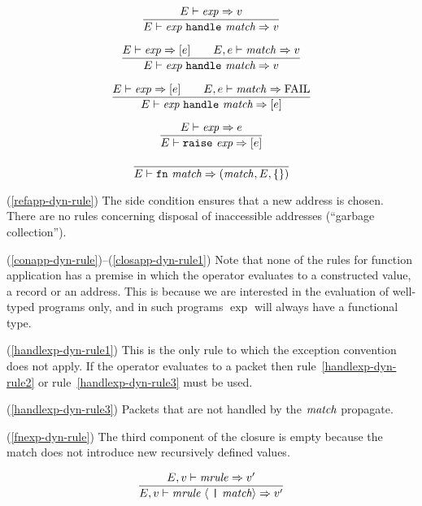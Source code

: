 \begin{equation}        %
\label{handlexp-dyn-rule1}
\frac{\E\ts\exp\ra\V}
     {\E\ts\handlexp\ra\V}
\end{equation}

\begin{equation}        %
\label{handlexp-dyn-rule2}
\frac{\E\ts\exp\ra[\exval]\qquad\E,\exval\ts\match\ra\V}
     {\E\ts\handlexp\ra\V}
\end{equation}

\begin{equation}        %
\label{handlexp-dyn-rule3}
\frac{\E\ts\exp\ra[\exval]\qquad\E,\exval\ts\match\ra\FAIL}
     {\E\ts\handlexp\ra[\exval]}
\end{equation}

\begin{equation}        %
\frac{\E\ts\exp\ra\exval}
     {\E\ts\raisexp\ra[\exval]}
\end{equation}

\begin{equation}        %
\label{fnexp-dyn-rule}
\frac{}
     {\E\ts\fnexp\ra(\match,\E,\emptymap)}
\end{equation}
\comments
\begin{description}
\item{(\ref{refapp-dyn-rule})}
  The side condition ensures that a new address is chosen. There are
no rules concerning disposal of inaccessible addresses (``garbage
collection'').
%
\item{(\ref{conapp-dyn-rule})--(\ref{closapp-dyn-rule1})}
  Note that none of the rules for function application has a
premise in which the operator evaluates to a constructed
value, a record or an address. This is because we are interested
in the evaluation of well-typed programs only, and in such programs $\exp$
will always have a functional type.
%
\item{(\ref{handlexp-dyn-rule1})}
  This is the only rule to which the exception convention does not apply.
If the operator evaluates to a packet then rule~\ref{handlexp-dyn-rule2}
or rule~\ref{handlexp-dyn-rule3} must be used.
%
\item{(\ref{handlexp-dyn-rule3})}
 Packets that are not handled by the ${\it match}$ propagate.
%
\item{(\ref{fnexp-dyn-rule})}
  The third component of the closure is empty because the match does not
introduce new recursively defined values.
\end{description}
%
%
\begin{equation}	%
\frac{\E,\V\ts\mrule\ra\V'}
     {\E,\V\ts\longmatch\ra\V'}\index{54.1}
\end{equation}

